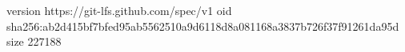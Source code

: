 version https://git-lfs.github.com/spec/v1
oid sha256:ab2d415bf7bfed95ab5562510a9d6118d8a081168a3837b726f37f91261da95d
size 227188
